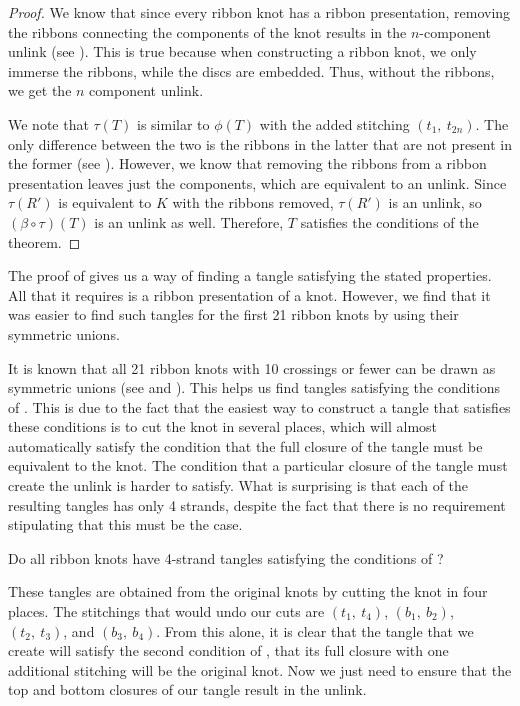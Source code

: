 \begin{paper}
\begin{proof}
We know that since every ribbon knot has a ribbon presentation, removing the
ribbons connecting the components of the knot results in the $n$-component
unlink (see \figPresentation).
This is true because when constructing a ribbon knot, we only immerse the
ribbons, while the discs are embedded.
Thus, without the ribbons, we get the $n$ component unlink.

We note that $\tau(T)$ is similar to $\phi(T)$ with the added stitching
$(t_1,~t_{2n})$.
The only difference between the two is the ribbons in the latter that are not
present in the former (see \figFinal).
However, we know that removing the ribbons from a ribbon presentation leaves
just the components, which are equivalent to an unlink.
Since $\tau(R')$ is equivalent to $K$ with the ribbons removed, $\tau(R')$ is an
unlink, so $(\beta\circ\tau)(T)$ is an unlink as well.
Therefore, $T$ satisfies the conditions of the theorem.
\end{proof}


The proof of \thmRibbon gives us a way of finding a tangle satisfying the stated
properties.
All that it requires is a ribbon presentation of a knot.
However, we find that it was easier to find such tangles for the first 21
ribbon knots by using their symmetric unions.

It is known that all 21 ribbon knots with 10 crossings or fewer can be drawn as
symmetric unions (see \cite{many} and \cite{one}).
This helps us find tangles satisfying the conditions of \thmRibbon.
This is due to the fact that the easiest way to construct a tangle that
satisfies these conditions is to cut the knot in several places, which will
almost automatically satisfy the condition that the full closure of the tangle
must be equivalent to the knot.
The condition that a particular closure of the tangle must create the unlink is
harder to satisfy.
What is surprising is that each of the resulting tangles has only 4 strands,
despite the fact that there is no requirement stipulating that this must be the
case.

{Do all ribbon knots have 4-strand tangles satisfying the conditions of
\thmRibbon?}

These tangles are obtained from the original knots by cutting the knot in four
places.
The stitchings that would undo our cuts are $(t_1,~t_4)$, $(b_1,~b_2)$,
$(t_2,~t_3)$, and $(b_3,~b_4)$.
From this alone, it is clear that the tangle that we create will satisfy the
second condition of \thmRibbon, that its full closure with one additional
stitching will be the original knot.
Now we just need to ensure that the top and bottom closures of our tangle
result in the unlink.


\end{paper}
